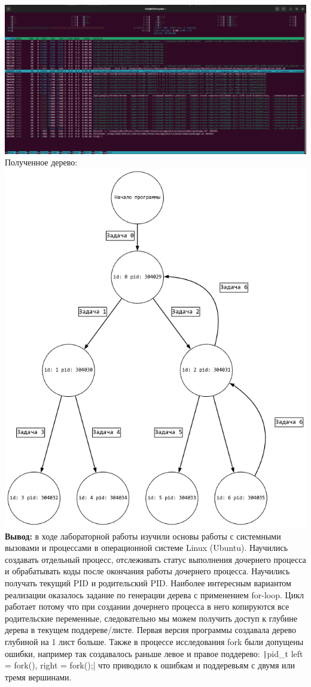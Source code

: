 \documentclass[a4paper,14pt]{extarticle}
\begin{document}
\includegraphics[width=140mm]{modified_htop_after}\\
Полученное дерево:\\
\includegraphics[width=140mm]{modified.png}\\

\textbf{Вывод: } в ходе лабораторной работы изучили основы работы с системными вызовами и процессами в операционной
системе Linux (Ubuntu). Научились создавать отдельный процесс, отслеживать статус выполнения дочернего процесса и обрабатывать 
коды после окончания работы дочернего процесса. Научились получать текущий PID и родительский PID. 
Наиболее интересным вариантом реализации оказалось задание по генерации дерева с применением for-loop. 
Цикл работает потому что при создании дочернего процесса в него копируются все родительские переменные, 
следовательно мы можем получить доступ к глубине дерева в текущем поддереве/листе. Первая версия программы
создавала дерево глубиной на 1 лист больше. Также в процессе исследования fork были допущены ошибки, например так
создавалось раньше левое и правое поддерево: \texttt|pid_t left = fork(), right = fork();| что приводило к ошибкам
и поддеревьям с двумя или тремя вершинами. 
\end{document}
